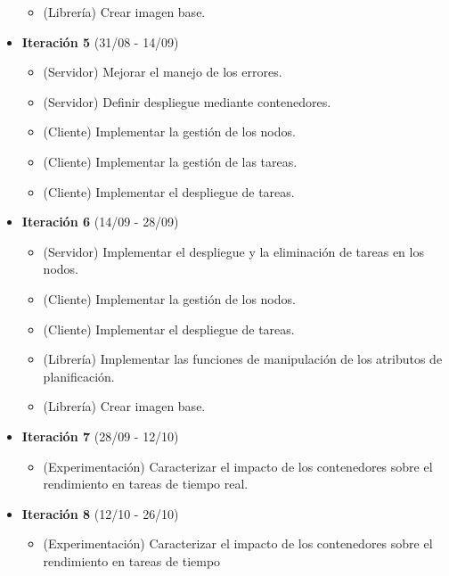 \begin{itemize}
\begin{itemize}
                  \item (Librería) Crear imagen base.
            \end{itemize}
      \item \textbf{Iteración 5} (31/08 - 14/09)
            \begin{itemize}
                  \item (Servidor) Mejorar el manejo de los errores.
                  \item (Servidor) Definir despliegue mediante contenedores.
                  \item (Cliente) Implementar la gestión de los nodos.
                  \item (Cliente) Implementar la gestión de las tareas.
                  \item (Cliente) Implementar el despliegue de tareas.
            \end{itemize}
      \item \textbf{Iteración 6} (14/09 - 28/09)
            \begin{itemize}
                  \item (Servidor) Implementar el despliegue y la eliminación de
                        tareas en los nodos.
                  \item (Cliente) Implementar la gestión de los nodos.
                  \item (Cliente) Implementar el despliegue de tareas.
                  \item (Librería) Implementar las funciones de manipulación de
                        los atributos de planificación.
                  \item (Librería) Crear imagen base.
            \end{itemize}
      \item \textbf{Iteración 7} (28/09 - 12/10)
            \begin{itemize}
                  \item (Experimentación) Caracterizar el impacto de los
                        contenedores sobre el rendimiento en tareas de tiempo
                        real.
            \end{itemize}
      \item \textbf{Iteración 8} (12/10 - 26/10)
            \begin{itemize}
                  \item (Experimentación) Caracterizar el impacto de los
                        contenedores sobre el rendimiento en tareas de tiempo

\end{itemize}
\end{itemize}
